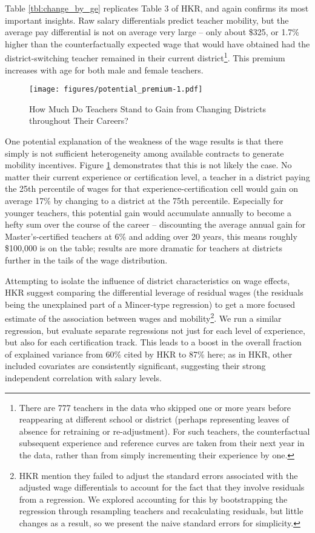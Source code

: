\documentclass[12pt,]{article}
\let\rmarkdownfootnote\footnote%
\def\footnote{\protect\rmarkdownfootnote}
\begin{document}
Table \ref{tbl:change_by_ge} replicates Table 3 of HKR, and again
confirms its most important insights. Raw salary differentials predict
teacher mobility, but the average pay differential is not on average
very large -- only about \$325, or 1.7\% higher than the
counterfactually expected wage that would have obtained had the
district-switching teacher remained in their current district\footnote{There
  are 777 teachers in the data who skipped one or more years before
  reappearing at different school or district (perhaps representing
  leaves of absence for retraining or re-adjustment). For such teachers,
  the counterfactual subsequent experience and reference curves are
  taken from their next year in the data, rather than from simply
  incrementing their experience by one.}. This premium increases with
age for both male and female teachers.

\begin{figure}[htbp]
\centering
\texttt{[image: figures/potential\_premium-1.pdf]}
\caption{\label{fig:premia}How Much Do Teachers Stand to Gain from
Changing Districts throughout Their Careers?}
\end{figure}

One potential explanation of the weakness of the wage results is that
there simply is not sufficient heterogeneity among available contracts
to generate mobility incentives. Figure \ref{fig:premia} demonstrates
that this is not likely the case. No matter their current experience or
certification level, a teacher in a district paying the 25th percentile
of wages for that experience-certification cell would gain on average
17\% by changing to a district at the 75th percentile. Especially for
younger teachers, this potential gain would accumulate annually to
become a hefty sum over the course of the career -- discounting the
average annual gain for Master's-certified teachers at 6\% and adding
over 20 years, this means roughly \$100,000 is on the table; results are
more dramatic for teachers at districts further in the tails of the wage
distribution.

Attempting to isolate the influence of district characteristics on wage
effects, HKR suggest comparing the differential leverage of residual
wages (the residuals being the unexplained part of a Mincer-type
regression) to get a more focused estimate of the association between
wages and mobility\footnote{HKR mention they failed to adjust the
  standard errors associated with the adjusted wage differentials to
  account for the fact that they involve residuals from a regression. We
  explored accounting for this by bootstrapping the regression through
  resampling teachers and recalculating residuals, but little changes as
  a result, so we present the naive standard errors for simplicity.}. We
run a similar regression, but evaluate separate regressions not just for
each level of experience, but also for each certification track. This
leads to a boost in the overall fraction of explained variance from 60\%
cited by HKR to 87\% here; as in HKR, other included covariates are
consistently significant, suggesting their strong independent
correlation with salary levels.
\end{document}
